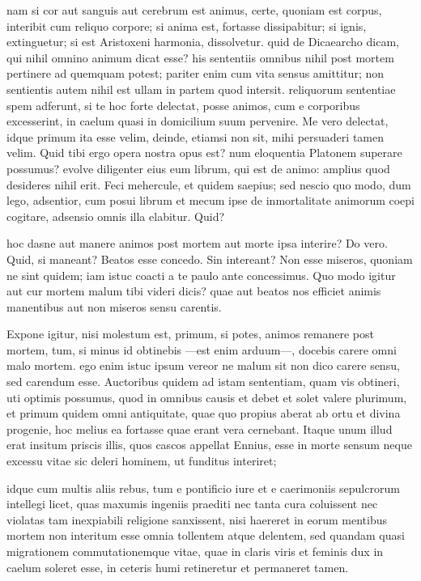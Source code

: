  nam si cor aut sanguis aut cerebrum est animus, certe, quoniam est corpus, interibit cum reliquo corpore; si anima est, fortasse dissipabitur; si ignis, extinguetur; si est Aristoxeni harmonia, dissolvetur. quid de Dicaearcho dicam, qui nihil omnino animum dicat esse? his sententiis omnibus nihil post mortem pertinere ad quemquam potest; pariter enim cum vita sensus amittitur; non sentientis autem nihil est ullam in partem quod intersit. reliquorum sententiae spem adferunt, si te hoc forte delectat, posse animos, cum e corporibus excesserint, in caelum quasi in domicilium suum pervenire. Me vero delectat, idque primum ita esse velim, deinde, etiamsi non sit, mihi persuaderi tamen velim. Quid tibi ergo opera nostra opus est? num eloquentia Platonem superare possumus? evolve diligenter eius eum librum, qui est de animo: amplius quod desideres nihil erit. Feci mehercule, et quidem saepius; sed nescio quo modo, dum lego, adsentior, cum posui librum et mecum ipse de inmortalitate animorum coepi cogitare, adsensio omnis illa elabitur. Quid?

 hoc dasne aut manere animos post mortem aut morte ipsa interire? Do vero. Quid, si maneant? Beatos esse concedo. Sin intereant? Non esse miseros, quoniam ne sint quidem; iam istuc coacti a te paulo ante concessimus. Quo modo igitur aut cur mortem malum tibi videri dicis? quae aut beatos nos efficiet animis manentibus aut non miseros sensu carentis.

 Expone igitur, nisi molestum est, primum, si potes, animos remanere post mortem, tum, si minus id obtinebis —est enim arduum—, docebis carere omni malo mortem. ego enim istuc ipsum vereor ne malum sit non dico carere sensu, sed carendum esse. Auctoribus quidem ad istam sententiam, quam vis obtineri, uti optimis possumus, quod in omnibus causis et debet et solet valere plurimum, et primum quidem omni antiquitate, quae quo propius aberat ab ortu et divina progenie, hoc melius ea fortasse quae erant vera cernebant. Itaque unum illud erat insitum priscis illis, quos cascos appellat Ennius, esse in morte sensum neque excessu vitae sic deleri hominem, ut funditus interiret;

 idque cum multis aliis rebus, tum e pontificio iure et e caerimoniis sepulcrorum intellegi licet, quas maxumis ingeniis praediti nec tanta cura coluissent nec violatas tam inexpiabili religione sanxissent, nisi haereret in eorum mentibus mortem non interitum esse omnia tollentem atque delentem, sed quandam quasi migrationem commutationemque vitae, quae in claris viris et feminis dux in caelum soleret esse, in ceteris humi retineretur et permaneret tamen.

